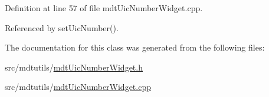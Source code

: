Definition at line 57 of file mdt\-Uic\-Number\-Widget.\-cpp.



Referenced by set\-Uic\-Number().



The documentation for this class was generated from the following files\-:\begin{DoxyCompactItemize}
\item 
src/mdtutils/\hyperlink{mdt_uic_number_widget_8h}{mdt\-Uic\-Number\-Widget.\-h}\item 
src/mdtutils/\hyperlink{mdt_uic_number_widget_8cpp}{mdt\-Uic\-Number\-Widget.\-cpp}\end{DoxyCompactItemize}
